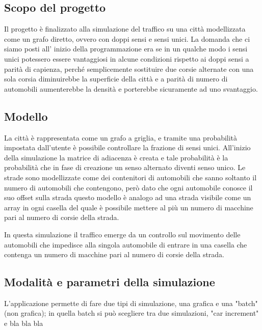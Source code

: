 \documentclass[main.tex]{subfiles}
\begin{document}
\subsection{Scopo del progetto}

Il progetto è finalizzato alla simulazione del traffico su una città modellizzata come un grafo diretto, ovvero con doppi sensi e sensi unici.
La domanda che ci siamo posti all' inizio della programmazione era se in un qualche modo i sensi unici potessero essere vantaggiosi in alcune condizioni
rispetto ai doppi sensi a parità di capienza, perché semplicemente sostituire due corsie alternate con una sola corsia diminuirebbe la superficie della città
e a parità di numero di automobili aumenterebbe la densità e porterebbe sicuramente ad uno svantaggio.

\subsection{Modello}

La città è rappresentata come un grafo a griglia, e tramite una probabilità impostata dall'utente è possibile controllare la frazione di sensi unici.
All'inizio della simulazione la matrice di adiacenza è creata e tale probabilità è la probabilità che in fase di creazione un senso alternato diventi senso unico.
Le strade sono modellizzate come dei contenitori di automobili che sanno soltanto il numero di automobili che contengono, però dato che ogni automobile conosce il suo offset sulla strada
questo modello è analogo ad una strada visibile come un array in ogni casella del quale è possibile mettere al più un numero di macchine pari al numero di corsie della strada.

In questa simulazione il traffico emerge da un controllo sul movimento delle automobili che impedisce
alla singola automobile di entrare in una casella che contenga un numero di macchine pari al numero di corsie della strada.

\subsection{Modalità e parametri della simulazione }

L'applicazione permette di fare due tipi di simulazione, una grafica e una "batch" (non grafica); in quella batch si può scegliere tra due simulazioni, "car increment" e bla bla bla

\end{document}
